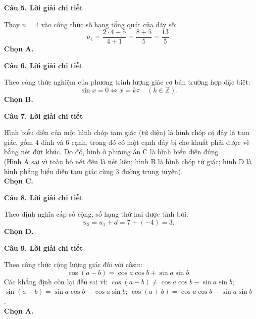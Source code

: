 \documentclass[12pt, a4paper]{article}
\begin{document}
\noindent\textbf{Câu 5. Lời giải chi tiết}\par
\begin{tcolorbox}[enhanced,breakable,colback=solutionbg,colframe=secondary!50!black,frame hidden,borderline west={3pt}{0pt}{secondary!50!black}]
Thay $n = 4$ vào công thức số hạng tổng quát của dãy số:
$$u_4 = \dfrac{2\cdot 4 + 5}{4 + 1} = \dfrac{8 + 5}{5} = \dfrac{13}{5}.$$
\textbf{Chọn A.}
\end{tcolorbox}

\noindent\textbf{Câu 6. Lời giải chi tiết}\par
\begin{tcolorbox}[enhanced,breakable,colback=solutionbg,colframe=secondary!50!black,frame hidden,borderline west={3pt}{0pt}{secondary!50!black}]
Theo công thức nghiệm của phương trình lượng giác cơ bản trường hợp đặc biệt:
$$\sin x = 0 \Leftrightarrow x = k\pi\quad (k\in\mathbb{Z}).$$
\textbf{Chọn B.}
\end{tcolorbox}

\noindent\textbf{Câu 7. Lời giải chi tiết}\par
\begin{tcolorbox}[enhanced,breakable,colback=solutionbg,colframe=secondary!50!black,frame hidden,borderline west={3pt}{0pt}{secondary!50!black}]
Hình biểu diễn của một hình chóp tam giác (tứ diện) là hình chóp có đáy là tam giác, gồm $4$ đỉnh và $6$ cạnh, trong đó có một cạnh đáy bị che khuất phải được vẽ bằng nét đứt khúc. Do đó, hình ở phương án C là hình biểu diễn đúng.\\
(Hình A sai vì toàn bộ nét đều là nét liền; hình B là hình chóp tứ giác; hình D là hình phẳng biểu diễn tam giác cùng 3 đường trung tuyến).\\
\textbf{Chọn C.}
\end{tcolorbox}

\noindent\textbf{Câu 8. Lời giải chi tiết}\par
\begin{tcolorbox}[enhanced,breakable,colback=solutionbg,colframe=secondary!50!black,frame hidden,borderline west={3pt}{0pt}{secondary!50!black}]
Theo định nghĩa cấp số cộng, số hạng thứ hai được tính bởi:
$$u_2 = u_1 + d = 7 + (-4) = 3.$$
\textbf{Chọn D.}
\end{tcolorbox}

\noindent\textbf{Câu 9. Lời giải chi tiết}\par
\begin{tcolorbox}[enhanced,breakable,colback=solutionbg,colframe=secondary!50!black,frame hidden,borderline west={3pt}{0pt}{secondary!50!black}]
Theo công thức cộng lượng giác đối với côsin:
$$\cos(a - b) = \cos a\cos b + \sin a\sin b.$$
Các khẳng định còn lại đều sai vì: $\cos(a - b) \ne \cos a\cos b - \sin a\sin b$; $\sin(a - b) = \sin a\cos b - \cos a\sin b$; $\cos(a + b) = \cos a\cos b - \sin a\sin b$.\\
\textbf{Chọn A.}
\end{tcolorbox}
\end{document}
